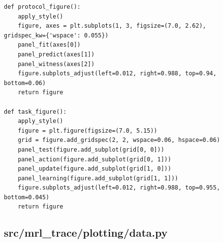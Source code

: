 \documentclass[a4paper,10pt]{article}
\begin{document}
\begin{Verbatim}
def protocol_figure():
    apply_style()
    figure, axes = plt.subplots(1, 3, figsize=(7.0, 2.62), gridspec_kw={'wspace': 0.055})
    panel_fit(axes[0])
    panel_predict(axes[1])
    panel_witness(axes[2])
    figure.subplots_adjust(left=0.012, right=0.988, top=0.94, bottom=0.06)
    return figure

def task_figure():
    apply_style()
    figure = plt.figure(figsize=(7.0, 5.15))
    grid = figure.add_gridspec(2, 2, wspace=0.06, hspace=0.06)
    panel_test(figure.add_subplot(grid[0, 0]))
    panel_action(figure.add_subplot(grid[0, 1]))
    panel_update(figure.add_subplot(grid[1, 0]))
    panel_learning(figure.add_subplot(grid[1, 1]))
    figure.subplots_adjust(left=0.012, right=0.988, top=0.955, bottom=0.045)
    return figure
\end{Verbatim}
\subsection{src/mrl\_trace/plotting/data.py}
\end{document}
